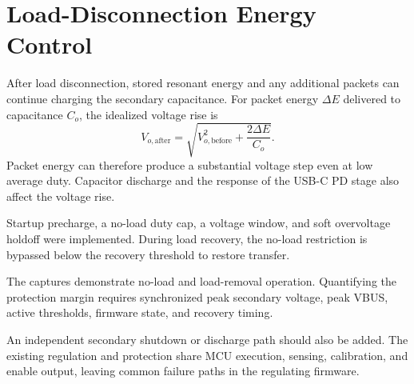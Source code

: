 \section{Load-Disconnection Energy Control}
\label{sec:disc-open}

After load disconnection, stored resonant energy and any additional packets
can continue charging the secondary capacitance. For packet energy
\(\Delta E\) delivered to capacitance \(C_o\), the idealized voltage rise is
\begin{equation}
V_{o,\mathrm{after}}=\sqrt{V_{o,\mathrm{before}}^2+\frac{2\Delta E}{C_o}}.
\label{eq:disc-burst-voltage-rise}
\end{equation}
Packet energy can therefore produce a substantial voltage step even at
low average duty. Capacitor discharge and the response of the USB-C PD stage also affect
the voltage rise.

Startup precharge, a no-load duty cap, a voltage window, and soft
overvoltage holdoff were implemented. During load recovery, the no-load
restriction is bypassed below the recovery threshold to restore transfer.

The captures demonstrate no-load and load-removal operation. Quantifying
the protection margin requires synchronized peak secondary voltage, peak
VBUS, active thresholds, firmware state, and recovery timing.

An independent secondary shutdown or discharge path should also be added.
The existing regulation and protection share MCU execution, sensing,
calibration, and enable output, leaving common failure paths in the
regulating firmware.
